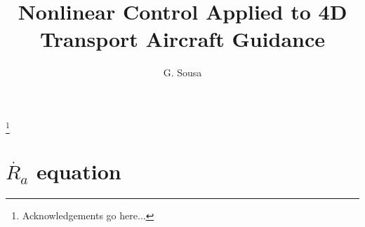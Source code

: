 \documentclass{ifacconf}
\begin{document}
\begin{frontmatter}

\title{Nonlinear Control Applied to 4D Transport Aircraft Guidance} 

\thanks[footnoteinfo]{Acknowledgements go here...}

\author[First]{G. Sousa} 

\address[First]{Instituto Superior Técnico, Lisbon, Portugal (guilherme.sousa@ist.utl.pt
).}



\end{frontmatter}








            

\appendix
 \section{$\dot{R_a}$ equation}
\label{sec:ra_dot}
\end{document}

